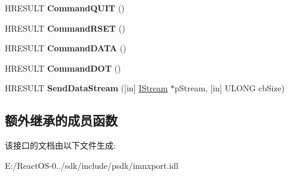 \begin{DoxyCompactItemize}
H\+R\+E\+S\+U\+LT {\bfseries Command\+Q\+U\+IT} ()
\item 
\mbox{\label{interface_i_s_m_t_p_transport_a3b9dd093251711ee747ec7ef90f00473}} 
H\+R\+E\+S\+U\+LT {\bfseries Command\+R\+S\+ET} ()
\item 
\mbox{\label{interface_i_s_m_t_p_transport_aca0f6dbb3cd94f36fce3914459998b11}} 
H\+R\+E\+S\+U\+LT {\bfseries Command\+D\+A\+TA} ()
\item 
\mbox{\label{interface_i_s_m_t_p_transport_a65df29a5cd0806eb7a0959eb3fc0a6fd}} 
H\+R\+E\+S\+U\+LT {\bfseries Command\+D\+OT} ()
\item 
\mbox{\label{interface_i_s_m_t_p_transport_af3cccaca9b51640415779917116d73b9}} 
H\+R\+E\+S\+U\+LT {\bfseries Send\+Data\+Stream} (\mbox{[}in\mbox{]} \hyperlink{interface_i_stream}{I\+Stream} $\ast$p\+Stream, \mbox{[}in\mbox{]} U\+L\+O\+NG cb\+Size)
\end{DoxyCompactItemize}
\subsection*{额外继承的成员函数}


该接口的文档由以下文件生成\+:\begin{DoxyCompactItemize}
\item 
E\+:/\+React\+O\+S-\/0../sdk/include/psdk/imnxport.\+idl\end{DoxyCompactItemize}
